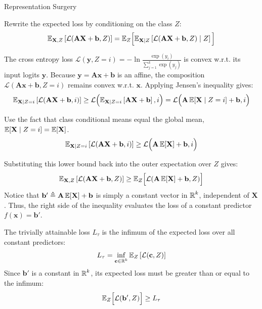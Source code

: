 \begin{question}{Representation Surgery}
\begin{subquestion}
Rewrite the expected loss by conditioning on the class $Z$:
\begin{equation}
    \expectation_{\mathbf{X}, Z}\left[\mathcal{L}(\mathbf{A}\mathbf{X} + \mathbf{b}, Z)\right] = \expectation_Z \Big[ \expectation_{\mathbf{X} \mid Z}\left[\mathcal{L}(\mathbf{A}\mathbf{X} + \mathbf{b}, Z) \mid Z\right] \Big]
\end{equation}

The cross entropy loss $\mathcal{L}(\mathbf{y}, Z = i) = -\ln \frac{\exp(y_i)}{\sum_{j=1}^k \exp(y_j)}$ is convex w.r.t. its input logits $\mathbf{y}$. 
Because $\mathbf{y} = \mathbf{A}\mathbf{x} + \mathbf{b}$ is an affine, the composition $\mathcal{L}(\mathbf{A}\mathbf{x} + \mathbf{b}, Z=i)$ remains convex w.r.t. $\mathbf{x}$.
Applying Jensen's inequality gives:
\begin{equation}
    \expectation_{\mathbf{X} \mid Z=i}\left[\mathcal{L}(\mathbf{A}\mathbf{X} + \mathbf{b}, i)\right] \geq \mathcal{L}\Big(\expectation_{\mathbf{X} \mid Z=i}\left[\mathbf{A}\mathbf{X} + \mathbf{b}\right], i\Big) = \mathcal{L}\Big(\mathbf{A}\,\expectation[\mathbf{X} \mid Z=i] + \mathbf{b}, i\Big)
\end{equation}

Use the fact that class conditional means equal the global mean, $\expectation[\mathbf{X} \mid Z = i] = \expectation[\mathbf{X}]$.
\begin{equation}
    \expectation_{\mathbf{X} \mid Z=i}\left[\mathcal{L}(\mathbf{A}\mathbf{X} + \mathbf{b}, i)\right] \geq \mathcal{L}\Big(\mathbf{A}\,\expectation[\mathbf{X}] + \mathbf{b}, i\Big)
\end{equation}

Substituting this lower bound back into the outer expectation over $Z$ gives:
\begin{equation}
    \expectation_{\mathbf{X}, Z}\left[\mathcal{L}(\mathbf{A}\mathbf{X} + \mathbf{b}, Z)\right] \geq \expectation_Z \Big[\mathcal{L}(\mathbf{A}\,\expectation[\mathbf{X}] + \mathbf{b}, Z)\Big]
\end{equation}
Notice that $\mathbf{b}' \triangleq \mathbf{A}\,\expectation[\mathbf{X}] + \mathbf{b}$ is simply a constant vector in $\R^k$, independent of $\mathbf{X}$. 
Thus, the right side of the inequality evaluates the loss of a constant predictor $f(\mathbf{x}) = \mathbf{b}'$.

The trivially attainable loss $L_\tau$ is the infimum of the expected loss over all constant predictors:
\begin{equation}
    L_\tau = \inf_{\mathbf{c} \in \R^k} \expectation_Z\left[\mathcal{L}(\mathbf{c}, Z)\right]
\end{equation}
Since $\mathbf{b}'$ is a constant in $\R^k$, its expected loss must be greater than or equal to the infimum:
\begin{equation}
    \expectation_Z \Big[\mathcal{L}(\mathbf{b}', Z)\Big] \geq L_\tau
\end{equation}


\end{subquestion}
\end{question}

